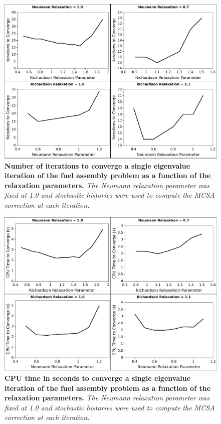 \begin{figure}[t!]
  \begin{center}
    \includegraphics[width=6in]{chapters/spn_equations/relax_iters.pdf}
  \end{center}
  \caption{\textbf{Number of iterations to converge a single
      eigenvalue iteration of the fuel assembly problem as a function
      of the relaxation parameters.} \textit{The Neumann relaxation
      parameter was fixed at 1.0 and  stochastic histories
      were used to compute the MCSA correction at each iteration.}}
  \label{fig:rich_relax_iters}
\end{figure}

\begin{figure}[t!]
  \begin{center}
    \includegraphics[width=6in]{chapters/spn_equations/relax_time.pdf}
  \end{center}
  \caption{\textbf{CPU time in seconds to converge a single eigenvalue
      iteration of the fuel assembly problem as a function of the
      relaxation parameters.} \textit{The Neumann relaxation parameter
      was fixed at 1.0 and  stochastic histories were used to
      compute the MCSA correction at each iteration.}}
  \label{fig:rich_relax_time}
\end{figure}

